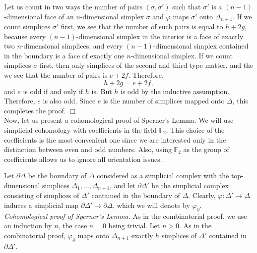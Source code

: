 \documentclass[leqno, 11pt]{article}\usepackage{latexsym}\usepackage{amsmath, amscd}\usepackage{amssymb}
\begin{document}
Let us count in two ways the number of pairs $(\sigma, \sigma')$ such that $\sigma'$ is a 
$(n-1)$-dimensional face of an $n$-dimensional simplex $\sigma$ and $\varphi$ maps $\sigma'$ onto $\Delta_{n+1}$. 
If we count simplices $\sigma'$ first, we see that the number of such pairs is equal to $h+2g$, 
because every $(n-1)$-dimensional simplex in the interior is a face of exactly two $n$-dimensional simplices, 
and every $(n-1)$-dimensional simplex contained in the boundary is a face of exactly one  $n$-dimensional simplex. 
If we count simplices $\sigma$ first, then only simplices of the second and third type matter, and the we see that the number of pairs is $e+2f$. 
Therefore,
\begin{equation}
\label{sperner}
h+2g=e+2f,
\end{equation}
and $e$ is odd if and only if $h$ is. But $h$ is odd by the inductive assumption. Therefore, $e$ is also odd. Since $e$ is the number of  
simplices mapped onto $\Delta$, this completes the proof. $\Box$ \\

Now, let us present a cohomological proof of Sperner's Lemma. We will use simplicial cohomology with coefficients in the 
field ${\mathbb F}_2$. This choice of the coefficients is the most convenient one since 
we are interested only in the distinction between even and odd numbers. Also, using ${\mathbb F}_2$ 
as the group of coefficients allows us to ignore all orientation issues. 

Let $\partial\Delta$ be the boundary of $\Delta$ considered as a simplicial complex with the top-dimensional simplices $\Delta_1,\ldots,\Delta_{n+1}$, and let 
$\partial\Delta'$ be the simplicial complex consisting of simplices of $\Delta'$ contained in the boundary of $\Delta$. Clearly, $\varphi: \Delta'\rightarrow\Delta$ induces a simplicial map $\partial\Delta'\rightarrow\partial\Delta$, which we will denote by $\varphi_{\partial}$.\\

\noindent
{\em Cohomological proof of Sperner's Lemma.} As in the combinatorial proof, we use an induction by $n$, the case $n=0$ being trivial. Let $n>0$. As in the combinatorial proof, $\varphi_{\partial}$ maps onto $\Delta_{n+1}$ exactly $h$ simplices of $\Delta'$ contained in  $\partial\Delta'$. 
\end{document}
